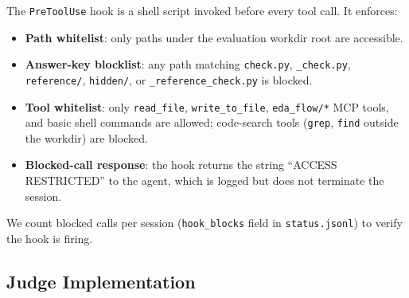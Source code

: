 The \texttt{PreToolUse} hook is a shell script invoked before every tool call. It enforces:
{\sloppy\begin{itemize}
    \item \textbf{Path whitelist}: only paths under the evaluation workdir root are accessible.
    \item \textbf{Answer-key blocklist}: any path matching \texttt{check.py}, \texttt{\_check.py}, \texttt{reference/}, \texttt{hidden/}, or \texttt{\_reference\_check.py} is blocked.
    \item \textbf{Tool whitelist}: only \texttt{read\_file}, \texttt{write\_to\_file}, \texttt{eda\_flow/*} MCP tools, and basic shell commands are allowed; code-search tools (\texttt{grep}, \texttt{find} outside the workdir) are blocked.
    \item \textbf{Blocked-call response}: the hook returns the string ``ACCESS RESTRICTED'' to the agent, which is logged but does not terminate the session.
\end{itemize}}
We count blocked calls per session (\texttt{hook\_blocks} field in \texttt{status.jsonl}) to verify the hook is firing.

\subsection{Judge Implementation}
\label{sec:judge-impl}

